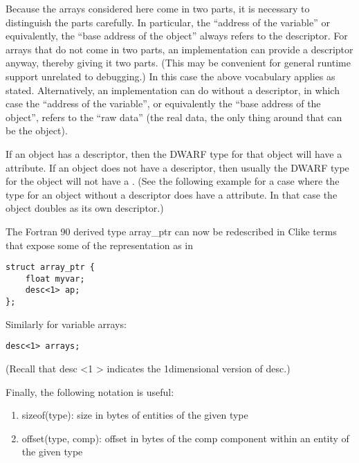 Because the arrays considered here come in two parts, it is
necessary to distinguish the parts carefully. In particular,
the “address of the variable” or equivalently, the “base
address of the object” always refers to the descriptor. For
arrays that do not come in two parts, an implementation can
provide a descriptor anyway, thereby giving it two parts. (This
may be convenient for general runtime support unrelated to
debugging.) In this case the above vocabulary applies as
stated. Alternatively, an implementation can do without a
descriptor, in which case the “address of the variable”,
or equivalently the “base address of the object”, refers
to the “raw data” (the real data, the only thing around
that can be the object).

If an object has a descriptor, then the DWARF type for that
object will have a 
 attribute. If an object
does not have a descriptor, then usually the DWARF type for the
object will not have a 
. 
(See the following
 example for a case where the type for an object without
a descriptor does have a  attribute. In
that case the object doubles as its own descriptor.)

The Fortran 90 derived type array\_ptr can now be redescribed
in C\dash like terms that expose some of the representation as in

\begin{lstlisting}
struct array_ptr {
    float myvar;
    desc<1> ap;
};
\end{lstlisting}

Similarly for variable arrays:
\begin{lstlisting}
desc<1> arrays;
\end{lstlisting}

(Recall that desc \textless 1 \textgreater 
indicates the 1\dash dimensional version of desc.)

Finally, the following notation is useful:

\begin{enumerate}[1.]
\item  sizeof(type): size in bytes of entities of the given type

\item offset(type, comp): offset in bytes of the comp component
within an entity of the given type
\end{enumerate}



